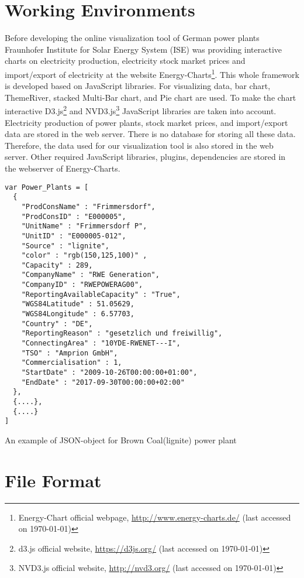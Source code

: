 \section{Working Environments}

Before developing the online visualization tool of German power plants Fraunhofer Institute for Solar Energy System (ISE) was providing interactive charts on electricity production, electricity stock market prices and import/export of electricity at the website Energy-Charts\footnote{Energy-Chart official webpage, \url{http://www.energy-charts.de/} (last accessed on {\today})}. This whole framework is developed based on JavaScript libraries. For visualizing data, bar chart, ThemeRiver, stacked Multi-Bar chart, and Pie chart are used. To make the chart interactive D3.js\footnote{d3.js official website, \url{https://d3js.org/} (last accessed on {\today})} and NVD3.js\footnote{NVD3.js official website, \url{http://nvd3.org/} (last accessed on {\today})} JavaScript libraries are taken into account. Electricity production of power plants, stock market prices, and import/export data are stored in the web server. There is no database for storing all these data. Therefore, the data used for our visualization tool is also stored in the web server. Other required JavaScript libraries, plugins, dependencies are stored in the webserver of Energy-Charts.

\begin{Listing}[H]
\begin{lstlisting}
var Power_Plants = [
  { 
    "ProdConsName" : "Frimmersdorf",
    "ProdConsID" : "E000005",
    "UnitName" : "Frimmersdorf P",
    "UnitID" : "E000005-012",
    "Source" : "lignite",
    "color" : "rgb(150,125,100)" ,
    "Capacity" : 289,
    "CompanyName" : "RWE Generation",
    "CompanyID" : "RWEPOWERAG00",
    "ReportingAvailableCapacity" : "True",
    "WGS84Latitude" : 51.05629,
    "WGS84Longitude" : 6.57703,
    "Country" : "DE",
    "ReportingReason" : "gesetzlich und freiwillig",
    "ConnectingArea" : "10YDE-RWENET---I",
    "TSO" : "Amprion GmbH",
    "Commercialisation" : 1,
    "StartDate" : "2009-10-26T00:00:00+01:00",
    "EndDate" : "2017-09-30T00:00:00+02:00"
  },
  {....},
  {....}
]
\end{lstlisting}
\caption{An example of JSON-object for Brown Coal(lignite) power plant}
\label{lst:pp-json}
\end{Listing}

\section{File Format}

